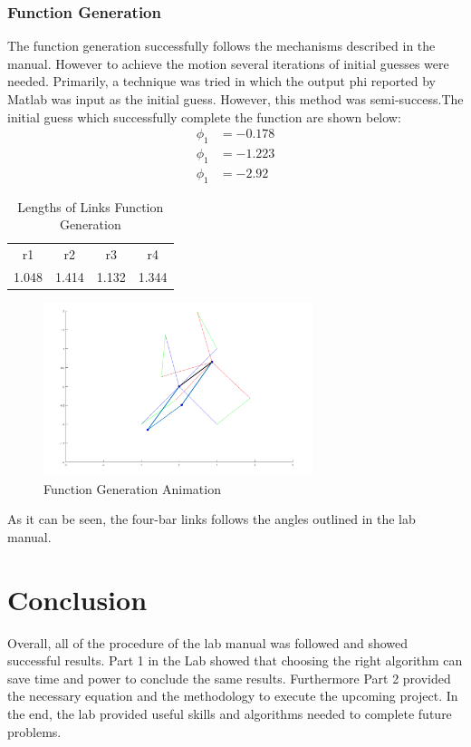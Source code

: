 \documentclass[12pt]{article}
\begin{document}
\subsubsection{Function Generation}
The function generation successfully follows the mechanisms described in the manual. However to achieve the motion several iterations of initial guesses were needed. Primarily, a technique was tried in which the output phi reported by Matlab was input as the initial guess. However, this method was semi-success.The initial guess which successfully complete the function are shown below:
\begin{align}
    \phi_1&=-0.178\nonumber\\
    \phi_1&=-1.223\nonumber\\
    \phi_1&=-2.92\nonumber
\end{align}
\begin{table}[H]
  \centering
  \caption{Lengths of Links Function Generation}
    \begin{tabular}{cccc}
    r1    & r2    & r3    & r4 \\
    1.048 & 1.414 & 1.132 & 1.344 \\
    \end{tabular}%
\end{table}%
\begin{figure}[H]
    \centering
    \includegraphics[width=0.7\textwidth]{FG_1.png}
    \caption{Function Generation Animation}
    \label{fig:FG_animation}
\end{figure}
As it can be seen, the four-bar links follows the angles outlined in the lab manual. 
\pagebreak
\section{Conclusion}
Overall, all of the procedure of the lab manual was followed and showed successful results. Part 1 in the Lab showed that choosing the right algorithm can save time and power to conclude the same results. Furthermore Part 2 provided the necessary equation and the methodology to execute the upcoming project. In the end, the lab provided useful skills and algorithms needed to complete future problems.
\pagebreak
\end{document}
